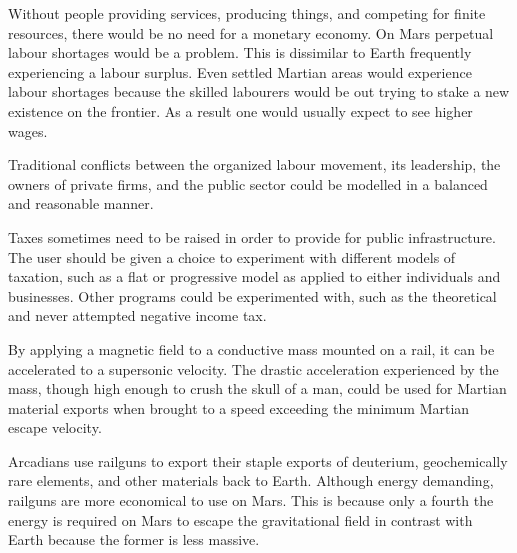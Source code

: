 Without people providing services, producing things, and competing for finite resources, there would be no need for a monetary economy. On Mars perpetual labour shortages would be a problem. This is dissimilar to Earth frequently experiencing a labour surplus. Even settled Martian areas would experience labour shortages because the skilled labourers would be out trying to stake a new existence on the frontier. As a result one would usually expect to see higher wages.

Traditional conflicts between the organized labour movement, its leadership, the owners of private firms, and the public sector could be modelled in a balanced and reasonable manner.

Taxes sometimes need to be raised in order to provide for public infrastructure. The user should be given a choice to experiment with different models of taxation, such as a flat or progressive model as applied to either individuals and businesses. Other programs could be experimented with, such as the theoretical and never attempted negative income tax.

By applying a magnetic field to a conductive mass mounted on a rail, it can be accelerated to a supersonic velocity. The drastic acceleration experienced by the mass, though high enough to crush the skull of a man, could be used for Martian material exports when brought to a speed exceeding the minimum Martian escape velocity.

\vfill
{}
    {}
\vfill

Arcadians use railguns to export their staple exports of deuterium, geochemically rare elements, and other materials back to Earth. Although energy demanding, railguns are more economical to use on Mars. This is because only a fourth the energy is required on Mars to escape the gravitational field in contrast with Earth because the former is less massive.

